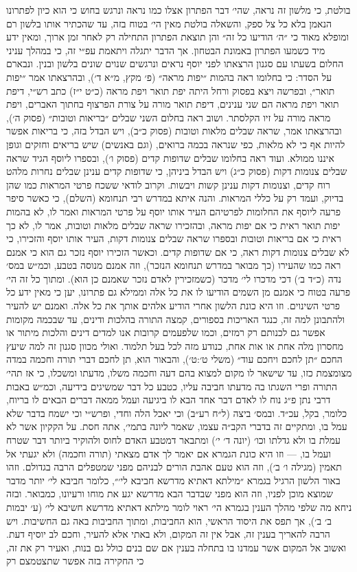 \documentclass[12pt, openany]{book}
\begin{document}
בולטת, כי מלשון זה נראה, שהי׳ דבר הפתרון אצלו כמו נראה ונרגש בחוש כי הוא כיון לפתרונו הנאמן בלא כל צל ספק, והשאלה בולטת מאין הי׳ בטוח בזה, עד שהכתיר אותו בלשון רם ומופלא מאוד כי ״ה׳ הודיעו כל זה״ והן תוצאת הפתרון התחילה רק לאחר זמן ארוך, ומאין ידע מיד כשמעו הפתרון באמונת הבטחון. אך הדבר יתגלה ויתאמת עפ״י זה, כי במהלך עניני החלום בשעתו עם  סגנון הרצאתו לפני יוסף נראים ונרגשים שנוים שונים בלשון ובנין. ונבארם על הסדר: כי בחלומו ראה בהמות ״יפות מראה״ (פ׳ מקץ, מ״א ד׳), ובהרצאתו אמר ״יפות תואר״, ובפרשה ויצא בפסוק ורחל היתה יפת תואר ויפת מראה (כ״ט י״ז) כתב רש״י, דיפת תואר ויפת מראה הם שני ענינים, דיפת תואר מורה על צורת הפרצוף בחתוך האברים, ויפת מראה מורה על זיו הקלסתר. ושוב ראה בחלום השני שבלים ״בריאות וטובות״ (פסוק ה׳), ובהרצאתו אמר, שראה שבלים מלאות וטובות (פסוק כ״ב), ויש הבדל בזה, כי בריאות אפשר להיות אף כי לא מלאות, כפי שנראה בכמה ברואים, (וגם באנשים) שיש בריאים וחזקים וגופן איננו ממולא. ועוד ראה בחלומו שבלים שדופות קדים (פסוק ו׳), ובספרו ליוסף הגיד שראה שבלים צנומות דקות (פסוק כ״ג) ויש הבדל ביניהן, כי שדופות קדים ענינן שבלים נחרות מלהט רוח קדים, וצנומות דקות ענינן קשות ויבשות. וקרוב לודאי ששכח פרטי המראות כמו שהן בדיוק, ועמד רק על כללי המראות. והנה איתא במדרש רבי תנחומא (השלם), כי כאשר סיפר פרעה ליוסף את החלומות לפרטיהם העיר אותו יוסף על פרטי המראות ואמר לו, לא בהמות יפות תואר ראית כי אם יפות מראה, ובהזכירו שראה שבלים מלאות וטובות, אמר לו, לא כך ראית כי אם בריאות וטובות ובספרו שראה שבלים צנומות דקות, העיר אותו יוסף והזכירו, כי לא שבלים צנומות דקות ראה, כי אם שדופות קדים. וכאשר הזכירו יוסף נזכר גם הוא כי אמנם ראה כמו שהעירו (כך מבואר במדרש תנחומא הנזכר), וזה אמנם מנוסה בטבע, וכמ״ש במס׳ נדה (כ״ד ב׳) דכי מדכרו לי׳ מדכר (כשמזכירין לאדם נזכר שאמנם כן הוא). ומתוך כל זה הי׳ פרעה בטוח כי אמנם מן השמים הודיעו לו את כל אלה וממילא גם פתרונו, יען כי מאין ידע כל פרטי השינוים. וזו היא כונת הלשון אחרי הודיע אלהים אותך את כל אלה. ואמנם יש להעיר ולהתבונן למה זה, כנגד האריכות בספורים, קמצה התורה בהלכות ודינים, עד שבכמה מקומות אפשר גם לכנותם רק רמזים, וכמו שלפעמים קרובות אנו למדים דינים והלכות מיתור או מחסרון מלה אחת או אות אחת, כנודע מזה לכל בעל תלמוד. ואולי מכוון סגנון זה למה שיעץ החכם ״תן לחכם ויחכם עוד״ (משלי ט׳:ט׳), והבאור הוא, תן לחכם דברי תורה וחכמה במדה מצומצמת כזו, עד שישאר לו מקום למצוא בהם דעה וחכמה משלו, מדעתו ומשכלו, כי אז תהי׳ התורה ופרי השגתו בה מדעתו חביבה עליו, כטבע כל דבר שמשיגים בידיעה, וכמ״ש באבות  דרבי נתן פ״ג נוח לו לאדם דבר אחד הבא לו ביגיעה ועמל ממאה דברים הבאים לו בריוח, כלומר, בקל, עכ״ד. ובמס׳ ביצה (ל״ח רע״ב) וכי יאכל הלה וחדי, ופרש״י וכי ישמח בדבר שלא עמל בו, ומתקיים זה בדברי הקב״ה עצמו, שאמר ליונה בתמי׳, אתה חסת. על הקקיון אשר לא עמלת בו ולא גדלתו וכו׳ (יונה ד׳ י׳) ומתבאר דמטבע האדם לחוס ולהוקיר ביותר דבר שטרח ועמל בו, — וזו היא כונת הגמרא אם יאמר לך אדם מצאתי (תורה וחכמה) ולא יגעתי אל תאמין (מגילה ו׳ ב׳), וזה הוא טעם אהבת הורים לבניהם מפני שמטפלים הרבה בגדולם. וזהו באור הלשון הרגיל בגמרא ״מילתא דאתיא מדרשא חביבא לי׳״, כלומר חביבא לי׳ יותר מדבר שמוצא מוכן לפניו, וזה הוא מפני שבדבר הבא מדרשא יגע את מוחו ורעיונו, כמבואר. ובזה ניחא מה שלפי מהלך הענין בגמרא הי׳ ראוי לומר מילתא דאתיא מדרשא חשיבא לי׳ (ע׳ יבמות ב׳ ב׳), אך תפס את היסוד הראשי, הוא החביבות, ומתוך החביבות באה גם החשיבות. ויש הרבה להאריך בענין זה, אבל אין זה המקום, ולא באתי אלא להעיר, וחכם לב יוסיף דעת. ואשוב אל המקום אשר עמדנו בו בתחלה בענין אם שם בנים כולל גם בנות, ואעיר רק את זה, כי החקירה בזה אפשר שתצטמצם רק 
\end{document}
